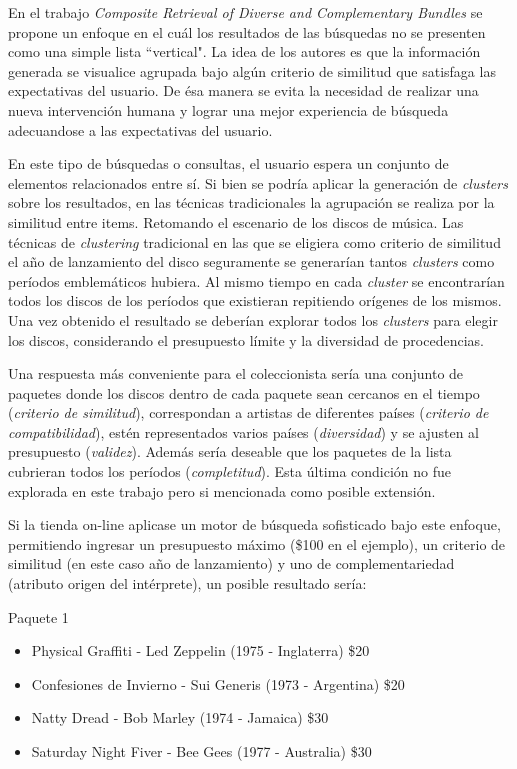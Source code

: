 En el trabajo {\em Composite Retrieval of Diverse and Complementary Bundles} \cite{compositeRetrival} se propone un enfoque en el cuál los resultados de las búsquedas no se presenten como una simple lista ``vertical". La idea de los autores es que la información generada se visualice agrupada bajo algún criterio de similitud que satisfaga las expectativas del usuario. De ésa manera se evita la necesidad de realizar una nueva intervención humana y lograr una mejor experiencia de búsqueda adecuandose a las expectativas del usuario.

En este tipo de búsquedas o consultas, el usuario espera un conjunto de elementos relacionados entre sí. Si bien se podría aplicar la generación de {\em clusters} sobre los resultados, en las técnicas tradicionales la agrupación se realiza por la similitud entre items. Retomando el escenario de los discos de música. Las técnicas de {\em clustering} tradicional en las que se eligiera como criterio de similitud el año de lanzamiento del disco seguramente se generarían tantos {\em clusters} como períodos emblemáticos hubiera. Al mismo tiempo en cada {\em cluster} se encontrarían todos los discos de los períodos que existieran repitiendo orígenes de los mismos. Una vez obtenido el resultado se deberían explorar todos los {\em clusters} para elegir los discos, considerando el presupuesto límite y la diversidad de procedencias.

Una respuesta más conveniente para el coleccionista sería una conjunto de paquetes donde los discos dentro de cada paquete sean cercanos en el tiempo ({\em criterio de similitud}), correspondan a artistas de diferentes países ({\em criterio de compatibilidad}), estén representados varios países ({\em diversidad}) y se ajusten al presupuesto ({\em validez}). Además sería deseable que los paquetes de la lista cubrieran todos los períodos ({\em completitud}). Esta última condición no fue explorada en este trabajo pero si mencionada como posible extensión.

Si la tienda on-line aplicase un motor de búsqueda sofisticado bajo este enfoque, permitiendo ingresar un presupuesto máximo (\$100 en el ejemplo), un criterio de similitud (en este caso año de lanzamiento) y uno de complementariedad (atributo origen del intérprete), un posible resultado sería:

\begin{mybox}{Paquete 1}
	\begin{itemize}
		\item {\scriptsize Physical Graffiti - Led Zeppelin (1975 - Inglaterra) \$20}
		\item {\scriptsize Confesiones de Invierno - Sui Generis (1973 - Argentina) \$20}
		\item {\scriptsize Natty Dread - Bob Marley (1974 - Jamaica) \$30}
		\item {\scriptsize Saturday Night Fiver - Bee Gees (1977 - Australia) \$30}
	\end{itemize}
\end{mybox}


